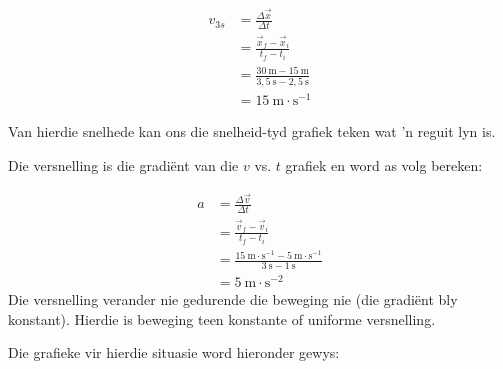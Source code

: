             
\begin{align*}
    {v}_{3s}&= \frac{\Delta \vec{x}}{\Delta t}\\ 
    &= \frac{\vec{x}_{f}-\vec{x}_{i}}{{t}_{f}-{t}_{i}}\\ 
    &= \frac{30~\text{m}-15~\text{m}}{3,5~\text{s}-2,5~\text{s}}\\ 
    &= 15~\text{m}\ensuremath{\cdot}{\text{s}}^{-1}
  \end{align*}
        \par 
Van hierdie snelhede kan ons die snelheid-tyd grafiek teken wat  'n reguit lyn is.\par
Die versnelling is die gradi\"ent van die $v$ vs. $t$ grafiek en word as volg bereken:\par
\begin{align*}
    a&= \frac{\Delta \vec{v}}{\Delta t} \\ 
    &= \frac{\vec{v}_{f}-\vec{v}_{i}}{{t}_{f}-{t}_{i}}\\ 
    &= \frac{15~\text{m}\ensuremath{\cdot}{\text{s}}^{-1}-5~\text{m}\ensuremath{\cdot}{\text{s}}^{-1}}{3~\text{s}-1~\text{s}}\\ 
    &= 5~\text{m}\ensuremath{\cdot}{\text{s}}^{-2}
\end{align*}
Die versnelling verander nie gedurende die beweging nie (die gradi\"ent bly konstant). Hierdie is beweging teen konstante of uniforme versnelling. \par

Die grafieke vir hierdie situasie word hieronder gewys:
    
